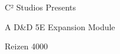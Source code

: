 \documentclass[12pt, landscape]{article}
\begin{document}
	\begin{Center}
		\large
		C² Studios Presents

		\Large
		A D\&D 5E Expansion Module

		\LARGE
		Reizen 4000
	\end{Center}

	\begin{FlushLeft}
		\begin{multicols}{2}
		\end{multicols}
	\end{FlushLeft}
\end{document}
